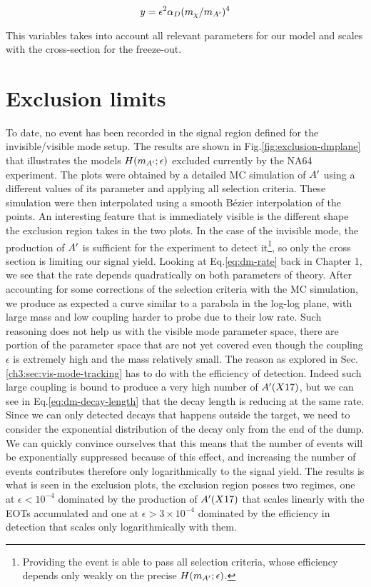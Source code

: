 \begin{equation}
  \label{eq:y-dm}
  y = \epsilon^2 \alpha_D (m_{\chi}/m_{A'})^4
\end{equation}

This variables takes into account all relevant parameters for our model and scales with the cross-section for the freeze-out.


\section{Exclusion limits}
\label{ch4:sec:exclusion limits}

To date, no event has been recorded in the signal region defined for the invisible/visible mode setup. The results are shown in Fig.\ref{fig:exclusion-dmplane} that illustrates the models $H(m_{A'};\epsilon)$ excluded currently by the NA64 experiment. The plots were obtained by a detailed MC simulation of $A'$ using a different values of its parameter and applying all selection criteria. These simulation were then interpolated using a smooth Bézier interpolation of the points. An interesting feature that is immediately visible is the different shape the exclusion region takes in the two plots. In the case of the invisible mode, the production of $A'$ is sufficient for the experiment to detect it\footnote{Providing the event is able to pass all selection criteria, whose efficiency depends only weakly on the precise $H(m_{A'};\epsilon)$.}, so only the cross section is limiting our signal yield. Looking at Eq.\ref{eq:dm-rate} back in Chapter 1, we see that the rate depends quadratically on both parameters of theory. After accounting for some corrections of the selection criteria with the MC simulation, we produce as expected a curve similar to a parabola in the log-log plane, with large mass and low coupling harder to probe due to their low rate. Such reasoning does not help us with the visible mode parameter space, there are portion of the parameter space that are not yet covered even though the coupling $\epsilon$ is extremely high and the mass relatively small. The reason as explored in Sec.\ref{ch3:sec:vis-mode-tracking} has to do with the efficiency of detection. Indeed such large coupling is bound to produce a very high number of $A'(X17)$, but we can see in Eq.\ref{eq:dm-decay-length} that the decay length is reducing at the same rate. Since we can only detected decays that happens outside the target, we need to consider the exponential distribution of the decay only from the end of the dump. We can quickly convince ourselves that this means that the number of events will be exponentially suppressed because of this effect, and increasing the number of events contributes therefore only logarithmically to the signal yield. The results is what is seen in the exclusion plots, the exclusion region posses two regimes, one at $\epsilon < 10^{-4}$ dominated by the production of $A'(X17)$ that scales linearly with the EOTs accumulated and one at $\epsilon > 3 \times 10^{-4}$ dominated by the efficiency in detection that scales only logarithmically with them.

